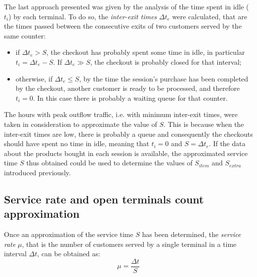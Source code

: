 The last approach presented was given by the analysis of the time spent in idle (\( t_i \)) by each terminal. To do so, the \emph{inter-exit times} \( \Delta t_e \) were calculated, that are the times passed between the consecutive exits of two customers served by the same counter:
\begin{itemize}
  \item if \( \Delta t_e > S \), the checkout has probably spent some time in idle, in particular \( t_i = \Delta t_e - S \). If \( \Delta t_e \gg S \), the checkout is probably closed for that interval;
  \item otherwise, if \( \Delta t_e \le S \), by the time the session’s purchase has been completed by the checkout, another customer is ready to be processed, and therefore \( t_i = 0 \). In this case there is probably a waiting queue for that counter.
\end{itemize}

The hours with peak outflow traffic, i.e. with minimum inter-exit times, were taken in consideration to approximate the value of \( S \). This is because when the inter-exit times are low, there is probably a queue and consequently the checkouts should have spent no time in idle, meaning that \( t_i = 0 \) and \( S = \Delta t_e \). If the data about the products bought in each session is available, the approximated service time \( S \) thus obtained could be used to determine the values of \( S_{item} \) and \( S_{extra} \) introduced previously.

\subsection{Service rate and open terminals count approximation}
\label{subsec:service_rate_and_open_terminals_count_approximation}

Once an approximation of the service time \( S \) has been determined, the \emph{service rate} \( \mu \), that is the number of customers served by a single terminal in a time interval \( \Delta t \), can be obtained as:
\begin{equation}
  \mu = \frac{\Delta t}{S}
  \label{eq:service_rate}
\end{equation}

